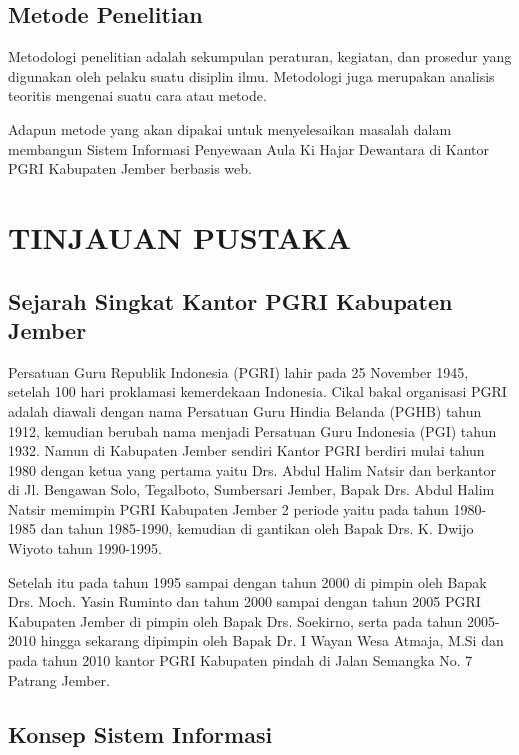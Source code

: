 \documentclass{jtetiproposalskripsi}
\begin{document}
\section{Metode Penelitian}
Metodologi penelitian adalah sekumpulan peraturan, kegiatan, dan prosedur yang digunakan oleh pelaku suatu disiplin ilmu. Metodologi juga merupakan analisis teoritis mengenai suatu cara atau metode.  

Adapun metode yang akan dipakai untuk menyelesaikan masalah dalam membangun Sistem Informasi Penyewaan Aula Ki Hajar Dewantara di Kantor PGRI Kabupaten Jember berbasis web.



\chapter{TINJAUAN PUSTAKA}               
\section{Sejarah Singkat Kantor PGRI Kabupaten Jember}
Persatuan Guru Republik Indonesia (PGRI)  lahir pada 25 November 1945, setelah 100 hari proklamasi kemerdekaan Indonesia. Cikal bakal organisasi PGRI adalah diawali dengan nama Persatuan Guru Hindia Belanda (PGHB) tahun 1912, kemudian berubah nama menjadi Persatuan Guru Indonesia (PGI) tahun 1932. Namun di Kabupaten Jember sendiri Kantor PGRI berdiri mulai tahun 1980 dengan ketua yang pertama yaitu Drs. Abdul Halim Natsir dan berkantor di Jl. Bengawan Solo, Tegalboto, Sumbersari Jember, Bapak Drs. Abdul Halim Natsir memimpin PGRI Kabupaten Jember 2 periode yaitu pada tahun 1980-1985 dan tahun 1985-1990, kemudian di gantikan oleh Bapak Drs. K. Dwijo Wiyoto tahun 1990-1995. 

Setelah itu pada tahun 1995 sampai dengan tahun 2000 di pimpin oleh Bapak Drs. Moch. Yasin Ruminto dan tahun 2000 sampai dengan tahun 2005 PGRI Kabupaten Jember di pimpin oleh Bapak Drs. Soekirno, serta pada tahun 2005-2010  hingga sekarang dipimpin oleh Bapak Dr. I Wayan Wesa Atmaja, M.Si dan pada tahun 2010 kantor PGRI Kabupaten pindah di Jalan Semangka No. 7 Patrang Jember.

\section{Konsep Sistem Informasi}
\end{document}
